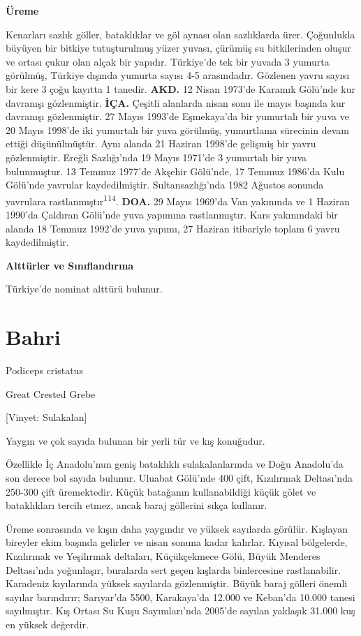 \documentclass[
  letterpaper,
  DIV=11,
  numbers=noendperiod]{scrreprt}
\begin{document}
\textbf{Üreme}

Kenarları sazlık göller, bataklıklar ve göl aynası olan sazlıklarda
ürer. Çoğunlukla büyüyen bir bitkiye tutuşturulmuş yüzer yuvası, çürümüş
su bitkilerinden oluşur ve ortası çukur olan alçak bir yapıdır.
Türkiye'de tek bir yuvada 3 yumurta görülmüş, Türkiye dışında yumurta
sayısı 4-5 arasındadır. Gözlenen yavru sayısı bir kere 3 çoğu kayıtta 1
tanedir. \textbf{AKD.} 12 Nisan 1973'de Karamık Gölü'nde kur davranışı
gözlenmiştir. \textbf{İÇA.} Çeşitli alanlarda nisan sonu ile mayıs
başında kur davranışı gözlenmiştir. 27 Mayıs 1993'de Eşmekaya'da bir
yumurtalı bir yuva ve 20 Mayıs 1998'de iki yumurtalı bir yuva görülmüş,
yumurtlama sürecinin devam ettiği düşünülmüştür. Aynı alanda 21 Haziran
1998'de gelişmiş bir yavru gözlenmiştir. Ereğli Sazlığı'nda 19 Mayıs
1971'de 3 yumurtalı bir yuva bulunmuştur. 13 Temmuz 1977'de Akşehir
Gölü'nde, 17 Temmuz 1986'da Kulu Gölü'nde yavrular kaydedilmiştir.
Sultansazlığı'nda 1982 Ağustos sonunda yavrulara
rastlanmıştır\textsuperscript{114}. \textbf{DOA.} 29 Mayıs 1969'da Van
yakınında ve 1 Haziran 1990'da Çaldıran Gölü'nde yuva yapımına
rastlanmıştır. Kars yakınındaki bir alanda 18 Temmuz 1992'de yuva
yapımı, 27 Haziran itibariyle toplam 6 yavru kaydedilmiştir.

\textbf{Alttürler ve Sınıflandırma}

Türkiye'de nominat alttürü bulunur.

\section{Bahri}\label{bahri}

Podiceps cristatus

Great Crested Grebe

{[}Vinyet: Sulakalan{]}

Yaygın ve çok sayıda bulunan bir yerli tür ve kış konuğudur.

Özellikle İç Anadolu'nun geniş bataklıklı sulakalanlarında ve Doğu
Anadolu'da son derece bol sayıda bulunur. Uluabat Gölü'nde 400 çift,
Kızılırmak Deltası'nda 250-300 çift üremektedir. Küçük batağanın
kullanabildiği küçük gölet ve bataklıkları tercih etmez, ancak baraj
göllerini sıkça kullanır.

Üreme sonrasında ve kışın daha yaygındır ve yüksek sayılarda görülür.
Kışlayan bireyler ekim başında gelirler ve nisan sonuna kadar kalırlar.
Kıyısal bölgelerde, Kızılırmak ve Yeşilırmak deltaları, Küçükçekmece
Gölü, Büyük Menderes Deltası'nda yoğunlaşır, buralarda sert geçen
kışlarda binlercesine rastlanabilir. Karadeniz kıyılarında yüksek
sayılarda gözlenmiştir. Büyük baraj gölleri önemli sayılar barındırır;
Sarıyar'da 5500, Karakaya'da 12.000 ve Keban'da 10.000 tanesi
sayılmıştır. Kış Ortası Su Kuşu Sayımları'nda 2005'de sayılan yaklaşık
31.000 kuş en yüksek değerdir.
\end{document}

